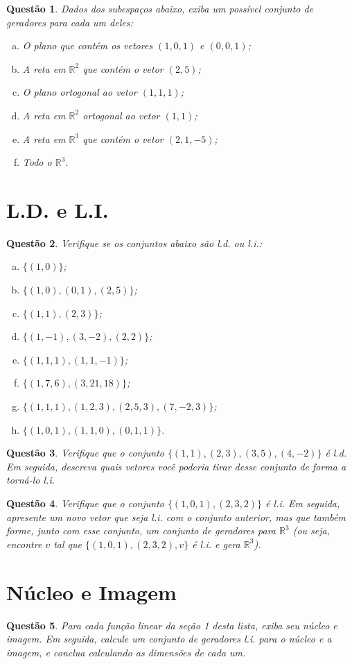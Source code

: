 \documentclass[a4paper,12pt]{article}
\def\R{\mathbb R}
\newtheorem{qst}{Questão}[section]
\begin{document}
\begin{qst}
	Dados dos subespaços abaixo, exiba um possível conjunto de geradores para cada um deles:
	\begin{enumerate}[a)]
		\item O plano que contém os vetores $(1,0,1)$ e $(0,0,1)$;
		\item A reta em $\R^2$ que contém o vetor $(2,5)$;
		\item O plano ortogonal ao vetor $(1,1,1)$;
		\item A reta em $\R^2$ ortogonal ao vetor $(1,1)$;
		\item A reta em $\R^3$ que contém o vetor $(2,1,-5)$;
		\item Todo o $\R^3$.
	\end{enumerate}
\end{qst}
\pagebreak
\section{L.D. e L.I.}
\begin{qst}
	Verifique se os conjuntos abaixo são l.d. ou l.i.:
	\begin{enumerate}[a)]
		\item $\{(1,0)\}$;
		\item $\{(1,0),(0,1),(2,5)\}$;
		\item $\{(1,1),(2,3)\}$;
		\item $\{(1,-1),(3,-2),(2,2)\}$;
		\item $\{(1,1,1),(1,1,-1)\}$;
		\item $\{(1,7,6),(3,21,18)\}$;
		\item $\{(1,1,1), (1,2,3), (2,5,3), (7,-2,3)\}$;
		\item $\{(1,0,1),(1,1,0),(0,1,1)\}$.
	\end{enumerate}
\end{qst}
\begin{qst}
	Verifique que o conjunto $\{(1,1), (2,3),(3,5), (4,-2)\}$ é l.d. Em seguida, descreva quais vetores você poderia tirar desse conjunto de forma a torná-lo l.i.
\end{qst}
\begin{qst}
	Verifique que o conjunto $\{(1,0,1),(2,3,2)\}$ é l.i. Em seguida, apresente um novo vetor que seja l.i. com o conjunto anterior, mas que também forme, junto com esse conjunto, um conjunto de geradores para $\R^3$ (ou seja, encontre $v$ tal que $\{(1,0,1),(2,3,2),v\}$ é l.i. e gera $\R^3$).
\end{qst}
\pagebreak
\section{Núcleo e Imagem}
\begin{qst}
	Para cada função linear da seção 1 desta lista, exiba seu núcleo e imagem. Em seguida, calcule um conjunto de geradores l.i. para o núcleo e a imagem, e conclua calculando as dimensões de cada um.
\end{qst}
\end{document}
